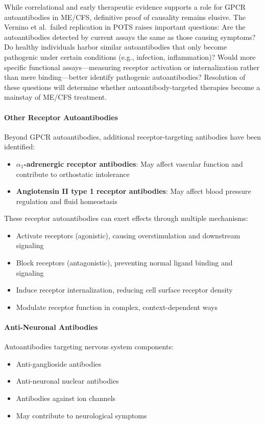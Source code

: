 \begin{open_question}
While correlational and early therapeutic evidence supports a role for GPCR autoantibodies in ME/CFS, definitive proof of causality remains elusive. The Vernino et al.\ failed replication in POTS raises important questions: Are the autoantibodies detected by current assays the same as those causing symptoms? Do healthy individuals harbor similar autoantibodies that only become pathogenic under certain conditions (e.g., infection, inflammation)? Would more specific functional assays---measuring receptor activation or internalization rather than mere binding---better identify pathogenic autoantibodies? Resolution of these questions will determine whether autoantibody-targeted therapies become a mainstay of ME/CFS treatment.
\end{open_question}

\paragraph{Other Receptor Autoantibodies}
Beyond GPCR autoantibodies, additional receptor-targeting antibodies have been identified:
\begin{itemize}
    \item \textbf{$\alpha_1$-adrenergic receptor antibodies}: May affect vascular function and contribute to orthostatic intolerance
    \item \textbf{Angiotensin II type 1 receptor antibodies}: May affect blood pressure regulation and fluid homeostasis
\end{itemize}

These receptor autoantibodies can exert effects through multiple mechanisms:
\begin{itemize}
    \item Activate receptors (agonistic), causing overstimulation and downstream signaling
    \item Block receptors (antagonistic), preventing normal ligand binding and signaling
    \item Induce receptor internalization, reducing cell surface receptor density
    \item Modulate receptor function in complex, context-dependent ways
\end{itemize}

\paragraph{Anti-Neuronal Antibodies}
Autoantibodies targeting nervous system components:
\begin{itemize}
    \item Anti-ganglioside antibodies
    \item Anti-neuronal nuclear antibodies
    \item Antibodies against ion channels
    \item May contribute to neurological symptoms
\end{itemize}

